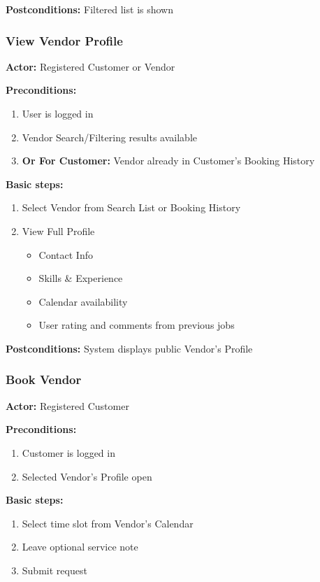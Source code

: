 \documentclass[11pt,a4paper]{article}
\begin{document}
\noindent \textbf{Postconditions:} Filtered list is shown

\subsubsection{View Vendor Profile}

\textbf{Actor:} Registered Customer or Vendor

\noindent \textbf{Preconditions:}
\begin{enumerate}
  \item User is logged in
  \item Vendor Search/Filtering results available
  \item \textbf{Or For Customer:} Vendor already in Customer's Booking History
\end{enumerate}

\noindent \textbf{Basic steps:}
\begin{enumerate}
  \item Select Vendor from Search List or Booking History
  \item View Full Profile
    \begin{itemize}
      \item Contact Info
      \item Skills \& Experience
      \item Calendar availability
      \item User rating and comments from previous jobs
    \end{itemize}
\end{enumerate}

\noindent \textbf{Postconditions:} System displays public Vendor's Profile

\subsubsection{Book Vendor}

\textbf{Actor:} Registered Customer

\noindent \textbf{Preconditions:}
\begin{enumerate}
  \item Customer is logged in
  \item Selected Vendor's Profile open
\end{enumerate}

\noindent \textbf{Basic steps:}
\begin{enumerate}
  \item Select time slot from Vendor's Calendar
  \item Leave optional service note
  \item Submit request
\end{enumerate}
\end{document}

